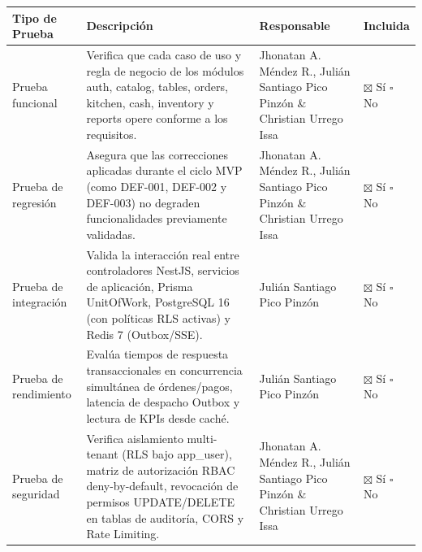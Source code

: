 \documentclass[10pt,a4paper]{article}
\newcounter{none}
\begin{document}
{\def\LTcaptype{none} %
\begin{longtable}[]{@{}
  >{\raggedright\arraybackslash}p{}
  >{\raggedright\arraybackslash}p{}
  >{\raggedright\arraybackslash}p{}
  >{\raggedright\arraybackslash}p{}@{}}
\toprule\noalign{}
\begin{minipage}[b]{\linewidth}\raggedright
Tipo de Prueba
\end{minipage} & \begin{minipage}[b]{\linewidth}\raggedright
Descripción
\end{minipage} & \begin{minipage}[b]{\linewidth}\raggedright
Responsable
\end{minipage} & \begin{minipage}[b]{\linewidth}\raggedright
Incluida
\end{minipage} \\
\midrule\noalign{}
\endhead
\bottomrule\noalign{}
\endlastfoot
Prueba funcional & Verifica que cada caso de uso y regla de negocio de los módulos auth, catalog, tables, orders, kitchen, cash, inventory y reports opere conforme a los requisitos. & Jhonatan A. Méndez R., Julián Santiago Pico Pinzón \& Christian Urrego Issa & \ensuremath{\boxtimes} Sí \ensuremath{\square} No \\
Prueba de regresión & Asegura que las correcciones aplicadas durante el ciclo MVP (como DEF-001, DEF-002 y DEF-003) no degraden funcionalidades previamente validadas. & Jhonatan A. Méndez R., Julián Santiago Pico Pinzón \& Christian Urrego Issa & \ensuremath{\boxtimes} Sí \ensuremath{\square} No \\
Prueba de integración & Valida la interacción real entre controladores NestJS, servicios de aplicación, Prisma UnitOfWork, PostgreSQL 16 (con políticas RLS activas) y Redis 7 (Outbox/SSE). & Julián Santiago Pico Pinzón & \ensuremath{\boxtimes} Sí \ensuremath{\square} No \\
Prueba de rendimiento & Evalúa tiempos de respuesta transaccionales en concurrencia simultánea de órdenes/pagos, latencia de despacho Outbox y lectura de KPIs desde caché. & Julián Santiago Pico Pinzón & \ensuremath{\boxtimes} Sí \ensuremath{\square} No \\
Prueba de seguridad & Verifica aislamiento multi-tenant (RLS bajo app\_user), matriz de autorización RBAC deny-by-default, revocación de permisos UPDATE/DELETE en tablas de auditoría, CORS y Rate Limiting. & Jhonatan A. Méndez R., Julián Santiago Pico Pinzón \& Christian Urrego Issa & \ensuremath{\boxtimes} Sí \ensuremath{\square} No \\

\end{longtable}}
\end{document}
